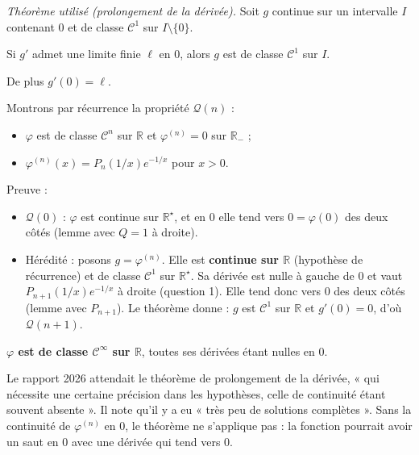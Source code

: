 \documentclass[11pt,a4paper]{article}
\providecommand{\tightlist}{\setlength{\itemsep}{0pt}\setlength{\parskip}{0pt}}
\begin{document}
\emph{Théorème utilisé (prolongement de la dérivée).} Soit \(g\) continue sur un intervalle \(I\) contenant \(0\) et de classe \(\mathcal C^1\) sur \(I\setminus\{0\}\).

Si \(g'\) admet une limite finie \(\ell\) en \(0\), alors \(g\) est de classe \(\mathcal C^1\) sur \(I\).

De plus \(g'(0)=\ell\).

Montrons par récurrence la propriété \(\mathcal Q(n)\) :

\begin{itemize}
\tightlist
\item
  \(\varphi\) est de classe \(\mathcal C^n\) sur \(\mathbb R\) et \(\varphi^{(n)}=0\) sur \(\mathbb R_-\) ;
\item
  \(\varphi^{(n)}(x)=P_n(1/x)e^{-1/x}\) pour \(x>0\).
\end{itemize}

Preuve :

\begin{itemize}
\tightlist
\item
  \(\mathcal Q(0)\) : \(\varphi\) est continue sur \(\mathbb R^\star\), et en \(0\) elle tend vers \(0=\varphi(0)\) des deux côtés (lemme avec \(Q=1\) à droite).
\item
  Hérédité : posons \(g=\varphi^{(n)}\). Elle est \textbf{continue sur \(\mathbb R\)} (hypothèse de récurrence) et de classe \(\mathcal C^1\) sur \(\mathbb R^\star\).
  Sa dérivée est nulle à gauche de \(0\) et vaut \(P_{n+1}(1/x)e^{-1/x}\) à droite (question 1).
  Elle tend donc vers \(0\) des deux côtés (lemme avec \(P_{n+1}\)).
  Le théorème donne : \(g\) est \(\mathcal C^1\) sur \(\mathbb R\) et \(g'(0)=0\), d'où \(\mathcal Q(n+1)\).
\end{itemize}

\textbf{\(\varphi\) est de classe \(\mathcal C^\infty\) sur \(\mathbb R\)}, toutes ses dérivées étant nulles en \(0\).

\begin{jury}

Le rapport 2026 attendait le théorème de prolongement de la dérivée, « qui nécessite une certaine précision dans les hypothèses, celle de continuité étant souvent absente ». Il note qu'il y a eu « très peu de solutions complètes ». Sans la continuité de \(\varphi^{(n)}\) en \(0\), le théorème ne s'applique pas : la fonction pourrait avoir un saut en \(0\) avec une dérivée qui tend vers \(0\).

\end{jury}
\end{document}
